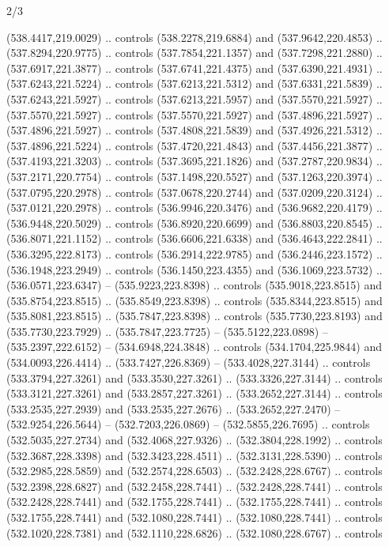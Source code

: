 \begin{flagdescription}{2/3}
\begin{scope}[xshift=0.5\flaglength,yshift=0.5\flagwidth,scale=\flagwidth/495.65]
\begin{scope}[y=0.8pt, x=0.8pt, yscale=-1,shift={(-463.76,-309.78)}]
  (538.4417,219.0029) .. controls (538.2278,219.6884) and (537.9642,220.4853) ..
  (537.8294,220.9775) .. controls (537.7854,221.1357) and (537.7298,221.2880) ..
  (537.6917,221.3877) .. controls (537.6741,221.4375) and (537.6390,221.4931) ..
  (537.6243,221.5224) .. controls (537.6213,221.5312) and (537.6331,221.5839) ..
  (537.6243,221.5927) .. controls (537.6213,221.5957) and (537.5570,221.5927) ..
  (537.5570,221.5927) .. controls (537.5570,221.5927) and (537.4896,221.5927) ..
  (537.4896,221.5927) .. controls (537.4808,221.5839) and (537.4926,221.5312) ..
  (537.4896,221.5224) .. controls (537.4720,221.4843) and (537.4456,221.3877) ..
  (537.4193,221.3203) .. controls (537.3695,221.1826) and (537.2787,220.9834) ..
  (537.2171,220.7754) .. controls (537.1498,220.5527) and (537.1263,220.3974) ..
  (537.0795,220.2978) .. controls (537.0678,220.2744) and (537.0209,220.3124) ..
  (537.0121,220.2978) .. controls (536.9946,220.3476) and (536.9682,220.4179) ..
  (536.9448,220.5029) .. controls (536.8920,220.6699) and (536.8803,220.8545) ..
  (536.8071,221.1152) .. controls (536.6606,221.6338) and (536.4643,222.2841) ..
  (536.3295,222.8173) .. controls (536.2914,222.9785) and (536.2446,223.1572) ..
  (536.1948,223.2949) .. controls (536.1450,223.4355) and (536.1069,223.5732) ..
  (536.0571,223.6347) -- (535.9223,223.8398) .. controls (535.9018,223.8515) and
  (535.8754,223.8515) .. (535.8549,223.8398) .. controls (535.8344,223.8515) and
  (535.8081,223.8515) .. (535.7847,223.8398) .. controls (535.7730,223.8193) and
  (535.7730,223.7929) .. (535.7847,223.7725) -- (535.5122,223.0898) --
  (535.2397,222.6152) -- (534.6948,224.3848) .. controls (534.1704,225.9844) and
  (534.0093,226.4414) .. (533.7427,226.8369) -- (533.4028,227.3144) .. controls
  (533.3794,227.3261) and (533.3530,227.3261) .. (533.3326,227.3144) .. controls
  (533.3121,227.3261) and (533.2857,227.3261) .. (533.2652,227.3144) .. controls
  (533.2535,227.2939) and (533.2535,227.2676) .. (533.2652,227.2470) --
  (532.9254,226.5644) -- (532.7203,226.0869) -- (532.5855,226.7695) .. controls
  (532.5035,227.2734) and (532.4068,227.9326) .. (532.3804,228.1992) .. controls
  (532.3687,228.3398) and (532.3423,228.4511) .. (532.3131,228.5390) .. controls
  (532.2985,228.5859) and (532.2574,228.6503) .. (532.2428,228.6767) .. controls
  (532.2398,228.6827) and (532.2458,228.7441) .. (532.2428,228.7441) .. controls
  (532.2428,228.7441) and (532.1755,228.7441) .. (532.1755,228.7441) .. controls
  (532.1755,228.7441) and (532.1080,228.7441) .. (532.1080,228.7441) .. controls
  (532.1020,228.7381) and (532.1110,228.6826) .. (532.1080,228.6767) .. controls

\end{scope}
\end{scope}
\end{flagdescription}
